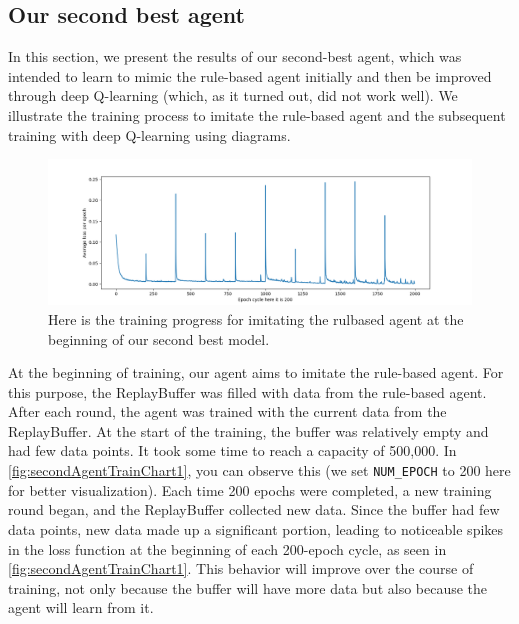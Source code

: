 \subsection{Our second best agent}

In this section, we present the results of our second-best agent, which was intended to learn to mimic the rule-based agent initially and 
then be improved through deep Q-learning (which, as it turned out, did not work well). We illustrate the training process to imitate the rule-based 
agent and the subsequent training with deep Q-learning using diagrams.

\begin{figure}[H]
    \centering
    
    \includegraphics[width=\oneImgWidth]{images/secondAgentTrainChart1}%
    
    \captionadjust%
    \caption{\label{fig:secondAgentTrainChart1} Here is  the training progress for imitating the rulbased agent at the beginning of our second best model.
    }%
\end{figure}

At the beginning of training, our agent aims to imitate the rule-based agent. For this purpose, the ReplayBuffer was filled with data 
from the rule-based agent. After each round, the agent was trained with the current data from the ReplayBuffer. At the start of the training, 
the buffer was relatively empty and had few data points. It took some time to reach a capacity of 500,000. In \autoref{fig:secondAgentTrainChart1}, you can observe 
this (we set \verb|NUM_EPOCH| to 200 here for better visualization). Each time 200 epochs were completed, a new training round began, and the 
ReplayBuffer collected new data. Since the buffer had few data points, new data made up a significant portion, leading to noticeable spikes 
in the loss function at the beginning of each 200-epoch cycle, as seen in \autoref{fig:secondAgentTrainChart1}. This behavior will improve over the course of training, not 
only because the buffer will have more data but also because the agent will learn from it.

